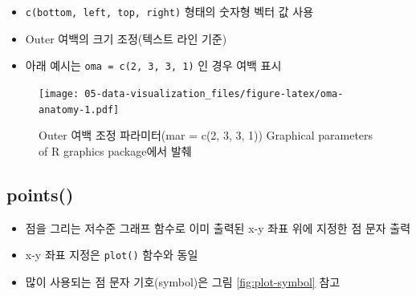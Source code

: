 \documentclass[
  11pt,
]{krantz}
\makeatletter
\providecommand{\tightlist}{%
  \setlength{\itemsep}{0pt}\setlength{\parskip}{0pt}}
\newenvironment{kframe}{%
\medskip{}
\setlength{\fboxsep}{.8em}
 \def\at@end@of@kframe{}%
 \ifinner\ifhmode%
  \def\at@end@of@kframe{\end{minipage}}%
  \begin{minipage}{\columnwidth}%
 \fi\fi%
 \def\FrameCommand##1{\hskip\@totalleftmargin \hskip-\fboxsep
 \colorbox{shadecolor}{##1}\hskip-\fboxsep
     \hskip-\linewidth \hskip-\@totalleftmargin \hskip\columnwidth}%
 \MakeFramed {\advance\hsize-\width
   \@totalleftmargin\z@ \linewidth\hsize
   \@setminipage}}%
 {\par\unskip\endMakeFramed%
 \at@end@of@kframe}
\renewenvironment{quote}{\begin{kframe}}{\end{kframe}}
\makeatother
\begin{document}
\begin{quote}
\begin{itemize}
\tightlist
\item
  \texttt{c(bottom,\ left,\ top,\ right)} 형태의 숫자형 벡터 값 사용
\item
  Outer 여백의 크기 조정(텍스트 라인 기준)
\item
  아래 예시는 \texttt{oma\ =\ c(2,\ 3,\ 3,\ 1)} 인 경우 여백 표시
\end{itemize}
\end{quote}

\footnotesize

\begin{figure}
\centering
\texttt{[image: 05-data-visualization\_files/figure-latex/oma-anatomy-1.pdf]}
\caption{\label{fig:oma-anatomy}Outer 여백 조정 파라미터(mar = c(2, 3, 3, 1)) Graphical parameters of R graphics package에서 발췌}
\end{figure}

\normalsize

\hypertarget{points}{%
\subsection{points()}\label{points}}

\begin{itemize}
\tightlist
\item
  점을 그리는 저수준 그래프 함수로 이미 출력된 x-y 좌표 위에 지정한 점 문자 출력
\item
  x-y 좌표 지정은 \texttt{plot()} 함수와 동일
\item
  많이 사용되는 점 문자 기호(symbol)은 그림 \ref{fig:plot-symbol} 참고
\end{itemize}

\footnotesize
\end{document}

